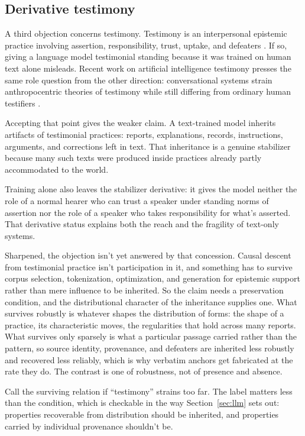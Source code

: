 \documentclass[12pt]{article}
\begin{document}
\subsection{Derivative testimony}

A third objection concerns testimony. Testimony is an interpersonal epistemic practice
involving assertion, responsibility, trust, uptake, and defeaters
\citep{coady_1992_testimony,lackey_2008_learning_from_words,goldberg_2010_relying_on_others}.
If so, giving a language model testimonial standing because it was trained on human text
alone misleads.
Recent work on artificial intelligence testimony presses the same role question from the
other direction: conversational systems strain anthropocentric theories of testimony
while still differing from ordinary human testifiers \citep{freiman_2024_ai_testimony}.

Accepting that point gives the weaker claim. A text-trained model inherits artifacts of
testimonial practices: reports, explanations, records,
instructions, arguments, and corrections left in text. That inheritance is a genuine
stabilizer because many such texts were produced inside practices already partly
accommodated to the world.

Training alone also leaves the stabilizer derivative: it gives the model neither the role
of a normal hearer who can trust a speaker under standing norms of assertion nor the role
of a speaker who takes responsibility for what's asserted. That derivative status
explains both the reach and the fragility of text-only systems.

Sharpened, the objection isn't yet answered by that concession. Causal descent
from testimonial practice isn't participation in it, and something has to survive corpus
selection, tokenization, optimization, and generation for epistemic support rather than
mere influence to be inherited. So the claim needs a preservation condition, and the
distributional character of the inheritance supplies one. What survives robustly is
whatever shapes the distribution of forms: the shape of a practice, its characteristic
moves, the regularities that hold across many reports. What survives only sparsely is what
a particular passage carried rather than the pattern, so source identity, provenance, and
defeaters are inherited less robustly and recovered less reliably, which is why verbatim anchors get fabricated
at the rate they do. The contrast is one of robustness, not of presence and absence.

Call the surviving relation  if \enquote{testimony} strains
too far. The label matters less than the condition, which is checkable in the way
Section~\ref{sec:llm} sets out: properties recoverable from distribution should be
inherited, and properties carried by individual provenance shouldn't be.
\end{document}
